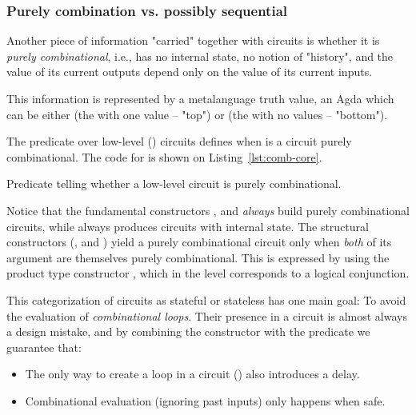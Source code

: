             \subsubsection{Purely combination vs. possibly sequential}
            Another piece of information "carried" together with circuits is whether it is
            \emph{purely combinational}, i.e., has no internal state, no notion of "history",
            and the value of its current outputs depend only on the value of its current inputs.

            This information is represented by a metalanguage truth value,
            an Agda  which can be either  (the  with one value -- "top") or
             (the  with no values -- "bottom").

            The predicate  over low-level () circuits defines when is a circuit purely combinational.
            The code for  is shown on Listing~\ref{lst:comb-core}.

            \begin{listing}[h]
                \caption{Predicate telling whether a low-level circuit is purely combinational.\label{lst:comb-core}}
            \end{listing}

            Notice that the fundamental constructors ,  and  \emph{always}
            build purely combinational circuits, while  always produces circuits with internal state.
            The structural constructors (,  and )
            yield a purely combinational circuit only when \emph{both} of its argument are themselves purely combinational.
            This is expressed by using the product type constructor , which in the 
            level corresponds to a logical conjunction.

            This categorization of circuits as stateful or stateless has one main goal:
            To avoid the evaluation of \emph{combinational loops}.
            Their presence in a circuit is almost always a design mistake, and by combining
            the  constructor with the  predicate we guarantee that:

            \begin{itemize}
                \item The only way to create a loop in a circuit () also introduces a delay.
                \item Combinational evaluation (ignoring past inputs) only happens when safe.
            \end{itemize}


